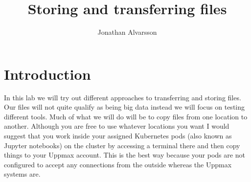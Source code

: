 \documentclass[watermark]{pbpreprint}
\begin{document}
\title{Storing and transferring files}
\newcommand{\subtitle}{Big Data in Life Science}
\renewcommand{\maketitlehookb}{\centering\textsc{\subtitle}}
\author{Jonathan Alvarsson}
\maketitle
\begin{KeepFromToc}
   \tableofcontents
\end{KeepFromToc}


\section{Introduction}
In this lab we will try out different approaches to transferring and storing
files. Our files will not quite qualify as being big data instead we will focus
on testing different tools. Much of what we will do will be to copy files from
one location to another. Although you are free to use whatever locations you
want I would suggest that you work inside your assigned Kubernetes pods (also
known as Jupyter notebooks) on the cluster by accessing a terminal there and
then copy things to your Uppmax account. This is the best way because your pods
are not configured to accept any connections from the outside whereas the
Uppmax systems are.
\end{document}
